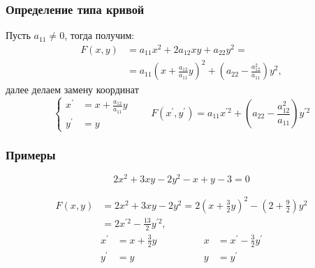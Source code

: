 \documentclass[10pt]{beamer}
\begin{document}
    \begin{frame}
        \frametitle{Определение типа кривой}
        Пусть $a_{11} \neq 0$, тогда получим:
        \begin{equation}
            \begin{aligned}
                F(x,y) & = a_{11}x^2 + 2a_{12}xy+a_{22}y^2 = \\
                & = a_{11}\left(x + \frac{a_{12}}{a_{11}}y \right)^2 + \left(a_{22} - \frac{a_{12}^2}{a_{11}} \right)y^2,
            \end{aligned}
        \end{equation} 
        далее делаем замену координат
        \begin{equation}
            \left\{
                \begin{aligned}
                    x^\prime & = x + \frac{a_{12}}{a_{11}}y \\
                    y^\prime & = y
                \end{aligned}
            \right.
            \qquad
            F(x^\prime, y^\prime) = a_{11}x^{\prime 2} + \left(a_{22} - \frac{a_{12}^2}{a_{11}} \right)y^{\prime 2}
        \end{equation}
    \end{frame}

    \begin{frame}
        \frametitle{Примеры}
        \begin{equation*}
            2x^2+3x y-2y^2-x+y-3=0
        \end{equation*}
    
        \begin{equation}
            \begin{aligned}
                F(x,y) & = 2x^2 + 3x y-2y^2 = 2\left(x + \frac{3}{2}y \right)^2 - \left(2 + \frac{9}{2}\right)y^2 \\
                & = 2x^{\prime 2} - \frac{13}{2} y^{\prime 2},
            \end{aligned}
        \end{equation} 
        \begin{equation}
            \begin{aligned}
                x^\prime & = x + \frac{3}{2}y \\
                y^\prime & = y
            \end{aligned}
            \qquad
            \qquad
            \begin{aligned}
                x & = x^\prime - \frac{3}{2}y^\prime \\
                y & = y^\prime
            \end{aligned}
        \end{equation}
    \end{frame}
    
\end{document}
